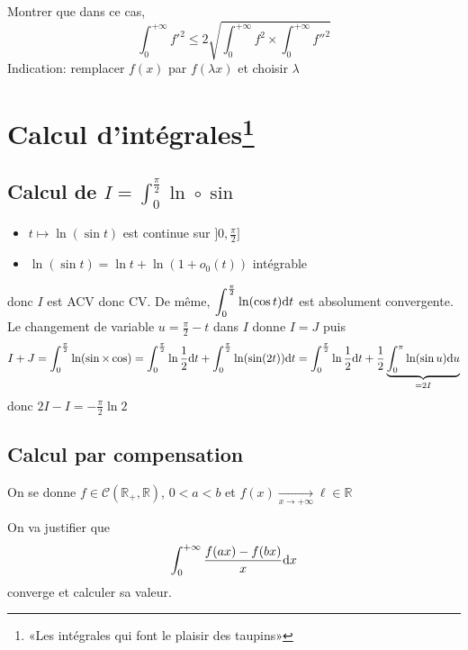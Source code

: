 \begin{exo}
    Montrer que dans ce cas, \[
        \int_0^{+\infty}f'^2\leq 2\sqrt{\int_0^{+\infty}f^2\times \int_0^{+\infty}f''^2}
    \]
    Indication: remplacer $f(x)$ par $f(\lambda x)$ et choisir $\lambda$
\end{exo}

\section{Calcul d'intégrales\texorpdfstring{\footnote{«Les intégrales qui font le plaisir des taupins»}}{}}

\subsection{Calcul de $I=\int_0^{\frac\pi2}\ln\circ \sin$}

\begin{itemize}
    \item $t\longmapsto \ln(\sin t)$ est continue sur $]0, \frac\pi2]$
    \item $\ln(\sin t)=\ln t+\ln(1+o_0(t))$ intégrable
\end{itemize}
donc $I$ est ACV donc CV. De même, $\displaystyle\int_0^{\frac\pi2}\ln(\cos t)\mathrm{d} t$ est absolument convergente. Le changement de variable $u=\frac\pi2-t$ dans $I$ donne $I=J$ puis \[
    I+J=\int_0^{\frac\pi2}\ln(\sin\times \cos)=\int_0^{\frac\pi2}\ln\frac12\mathrm{d} t+\int_0^{\frac\pi2}\ln(\sin(2t))\mathrm{d} t=\int_0^{\frac\pi2}\ln\frac12\mathrm{d} t+\frac12\underbrace{\int_0^\pi\ln(\sin u)\mathrm{d} u}_{=2I}
\]
donc $2I-I=-\frac\pi2\ln2$

\subsection{Calcul par compensation}

On se donne $f\in\mathcal C(\mathbb R_+, \mathbb R)$, $0<a<b$ et $f(x)\xrightarrow[x\to+\infty]{}\ell\in\mathbb R$

On va justifier que \[
    \int_0^{+\infty}\frac{f(ax)-f(bx)}x\mathrm{d} x
\]
converge et calculer sa valeur.
